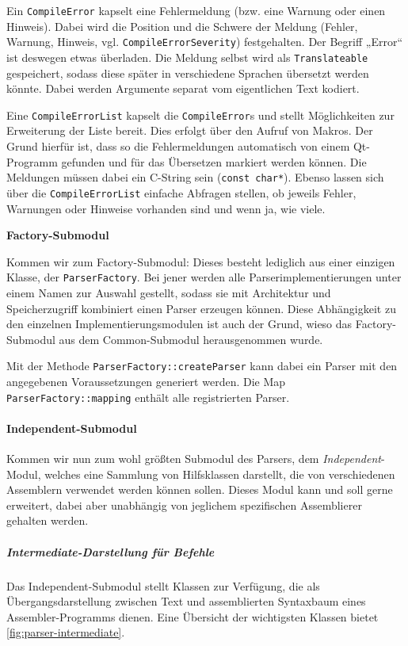 Ein \texttt{CompileError} kapselt eine Fehlermeldung (bzw. eine Warnung oder
einen Hinweis). Dabei wird die Position und die Schwere der Meldung (Fehler,
Warnung, Hinweis, vgl. \texttt{Compile\-Error\-Severity}) festgehalten. Der
Begriff „Error“ ist deswegen etwas überladen. Die Meldung selbst wird als
\texttt{Translateable} gespeichert, sodass diese später in verschiedene Sprachen
übersetzt werden könnte. Dabei werden Argumente separat vom eigentlichen Text
kodiert.

Eine \texttt{CompileErrorList} kapselt die \texttt{CompileError}s und stellt
Möglichkeiten zur Erweiterung der Liste bereit. Dies erfolgt über den Aufruf von
Makros. Der Grund hierfür ist, dass so die Fehlermeldungen automatisch von einem
Qt-Programm gefunden und für das Übersetzen markiert werden können. Die
Meldungen müssen dabei ein C-String sein (\texttt{const char*}). Ebenso lassen
sich über die \texttt{CompileErrorList} einfache Abfragen stellen, ob jeweils
Fehler, Warnungen oder Hinweise vorhanden sind und wenn ja, wie viele.

\textbf{Factory-Submodul}

Kommen wir zum Factory-Submodul: Dieses besteht lediglich aus einer einzigen
Klasse, der \texttt{ParserFactory}. Bei jener werden alle
Parserimplementierungen unter einem Namen zur Auswahl gestellt, sodass sie mit
Architektur und Speicherzugriff kombiniert einen Parser erzeugen können. Diese
Abhängigkeit zu den einzelnen Implementierungsmodulen ist auch der Grund, wieso
das Factory-Submodul aus dem Common-Submodul herausgenommen wurde.

Mit der Methode \texttt{ParserFactory::createParser} kann dabei ein Parser mit
den angegebenen Voraussetzungen generiert werden. Die Map
\texttt{ParserFactory::mapping} enthält alle registrierten Parser.

\paragraph{Independent-Submodul}

Kommen wir nun zum wohl größten Submodul des Parsers, dem
\emph{Independent}-Modul, welches eine Sammlung von Hilfsklassen darstellt,
die von verschiedenen Assemblern verwendet werden können sollen. Dieses Modul
kann und soll gerne erweitert, dabei aber unabhängig von jeglichem spezifischen
Assemblierer gehalten werden.

\subparagraph{Intermediate-Darstellung für Befehle}

Das Independent-Submodul stellt Klassen zur Verfügung, die als
Übergangsdarstellung zwischen Text und assemblierten Syntaxbaum eines
Assembler-Programms dienen. Eine Übersicht der wichtigsten Klassen bietet
\autoref{fig:parser-intermediate}.

